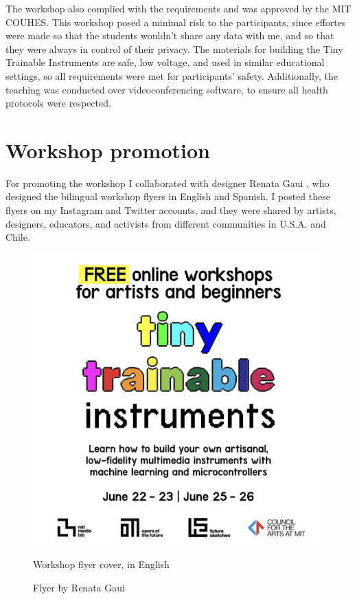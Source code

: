 The workshop also complied with the requirements and was approved by the \acrshort{MIT} \acrfull{COUHES}. This workshop posed a minimal risk to the participants, since effortes were made so that the students wouldn't share any data with me, and so that they were always in control of their privacy. The materials for building the Tiny Trainable Instruments are safe, low voltage, and used in similar educational settings, so all requirements were met for participants' safety. Additionally, the teaching was conducted over videoconferencing software, to ensure all health protocols were respected.

\section{Workshop promotion}

For promoting the workshop I collaborated with designer Renata Gaui \cite{website-renata-gaui}, who designed the bilingual workshop flyers in English and Spanish. I posted these flyers on my Instagram and Twitter accounts, and they were shared by  artists, designers, educators, and activists from different communities in U.S.A. and Chile.

\begin{figure}[ht]
  \centering
  \includegraphics[width=0.75\linewidth,height=0.35\textheight,keepaspectratio]{images/workshop-en-1.jpg}
  \caption{Workshop flyer cover, in English}
  \caption*{Flyer by Renata Gaui}
  \label{fig:workshop-english-flyer-page-1}
\end{figure}


